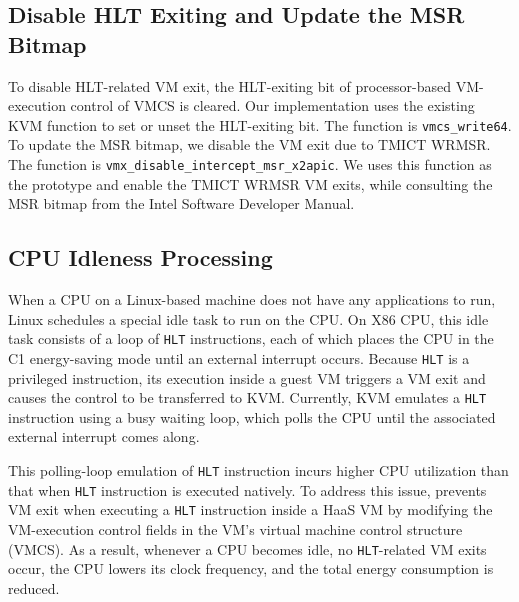 {\subsection{Disable HLT Exiting and Update the MSR Bitmap}
To disable HLT-related VM exit, the HLT-exiting bit of
processor-based VM-execution control of VMCS is cleared. 
Our
implementation uses the existing KVM function to set or unset
the HLT-exiting bit. The function is \texttt{vmcs\_write64}.
To update the MSR bitmap, we disable the VM exit due to TMICT
WRMSR. The function is
\texttt{vmx\_disable\_intercept\_msr\_x2apic}. We uses this
function as the prototype and enable the TMICT WRMSR VM exits,
while consulting the MSR bitmap from the Intel Software
Developer Manual.

\subsection{CPU Idleness Processing}

When a CPU on a Linux-based machine does not have any applications to run,
Linux schedules a special idle task to run on the CPU. On X86 CPU, this idle task consists of a loop of {\tt HLT} instructions, 
each of which places the CPU in the C1 energy-saving mode until an external interrupt occurs.
Because {\tt HLT} is a privileged instruction, its execution inside a guest VM triggers a VM exit and causes the control to be transferred to KVM. 
Currently, KVM emulates a {\tt HLT} instruction using a busy waiting loop, which polls the CPU until the associated external interrupt comes along. 

This polling-loop emulation of {\tt HLT} instruction incurs higher CPU utilization than that when {\tt HLT} instruction is executed natively. 
To address this issue, \na prevents VM exit when executing a {\tt HLT} instruction inside a HaaS VM by modifying the VM-execution control fields 
in the VM's virtual machine control structure (VMCS).
As a result, whenever a CPU becomes idle, no {\tt HLT}-related VM exits occur, the CPU lowers its clock frequency, and the total energy consumption is reduced. 

}

